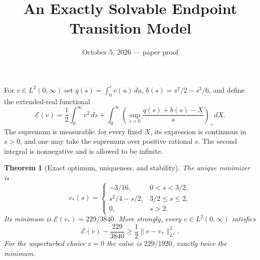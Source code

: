 \documentclass[11pt]{article}
\title{An Exactly Solvable Endpoint Transition Model}
\author{}\date{October 5, 2026 --- paper proof}
\newtheorem{theorem}{Theorem}
\begin{document}
\maketitle

For $v\in L^2(0,\infty)$ set $q(s)=\int_0^s v(u)\,du$, $b(s)=s^2/2-s^3/6$, and define the extended-real functional
\[
 \mathscr E(v)=\frac12\int_0^\infty v^2\,ds+
 \int_0^\infty\left(\sup_{s>0}\frac{q(s)+b(s)-X}{s}\right)_+dX.
\]
The supremum is measurable: for every fixed $X$, its expression is continuous in $s>0$, and one may take the supremum over positive rational $s$. The second integral is nonnegative and is allowed to be infinite.

\begin{theorem}[Exact optimum, uniqueness, and stability]
The unique minimizer is
\[
 v_*(s)=\begin{cases}
 -3/16,&0<s<3/2,\\
 s^2/4-s/2,&3/2\le s\le2,\\
 0,&s>2.
 \end{cases}
\]
Its minimum is $\mathscr E(v_*)=229/3840$. More strongly, every $v\in L^2(0,\infty)$ satisfies
\[
 \boxed{\mathscr E(v)-\frac{229}{3840}\ge\frac12\|v-v_*\|_{L^2}^2.}
\]
For the unperturbed choice $v=0$ the value is $229/1920$, exactly twice the minimum.
\end{theorem}
\end{document}
